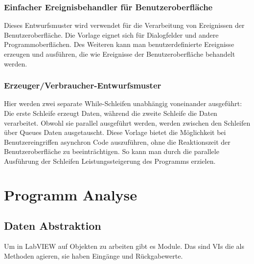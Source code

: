 \subsubsection{Einfacher Ereignisbehandler für Benutzeroberfläche}
Dieses Entwurfsmuster wird verwendet für die Verarbeitung von Ereignissen der Benutzeroberfläche. Die Vorlage eignet sich für Dialogfelder und andere Programmoberflächen. Des Weiteren kann man benutzerdefinierte Ereignisse erzeugen und ausführen, die wie Ereignisse der Benutzeroberfläche behandelt werden.

\subsubsection{Erzeuger/Verbraucher-Entwurfsmuster} %
Hier werden zwei separate While-Schleifen unabhängig voneinander ausgeführt: Die erste Schleife erzeugt Daten, während die zweite Schleife die Daten verarbeitet. Obwohl sie parallel ausgeführt werden, werden zwischen den Schleifen über Queues Daten ausgetauscht.
Diese Vorlage bietet die Möglichkeit bei Benutzereingriffen asynchron Code auszuführen, ohne die Reaktionszeit der Benutzeroberfläche zu beeinträchtigen. 
So kann man durch die parallele Ausführung der Schleifen Leistungssteigerung des Programms erzielen. 

		
		
\section{Programm Analyse}
\subsection{Daten Abstraktion}
Um in LabVIEW auf Objekten zu arbeiten gibt es Module. Das sind VIs die als Methoden agieren, sie haben Eingänge und Rückgabewerte.
